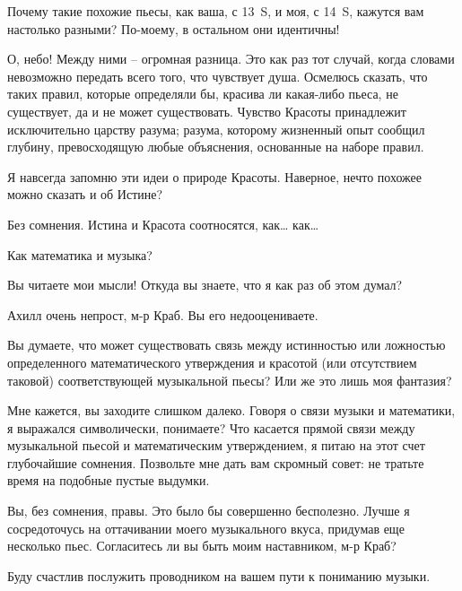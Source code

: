 \documentclass[../main.tex]{subfiles}
\begin{document}
\begin{dialogue}
 Почему такие похожие пьесы, как ваша, с 13~S, и моя, с 14~S, кажутся вам настолько разными? По-моему, в остальном они идентичны!

 О, небо! Между ними \--- огромная разница. Это как раз тот случай, когда словами невозможно передать всего того, что чувствует душа. Осмелюсь сказать, что таких правил, которые определяли бы, красива ли какая-либо пьеса, не существует, да и не может существовать. Чувство Красоты принадлежит исключительно царству разума; разума, которому жизненный опыт сообщил глубину, превосходящую любые объяснения, основанные на наборе правил.

 Я навсегда запомню эти идеи о природе Красоты. Наверное, нечто похожее можно сказать и об Истине?

 Без сомнения. Истина и Красота соотносятся, как\ldots{} как\ldots{}

 Как математика и музыка?

 Вы читаете мои мысли! Откуда вы знаете, что я как раз об этом думал?

 Ахилл очень непрост, м-р Краб. Вы его недооцениваете.

 Вы думаете, что может существовать связь между истинностью или ложностью определенного математического утверждения и красотой (или отсутствием таковой) соответствующей музыкальной пьесы? Или же это лишь моя фантазия?

 Мне кажется, вы заходите слишком далеко. Говоря о связи музыки и математики, я выражался символически, понимаете? Что касается прямой связи между музыкальной пьесой и математическим утверждением, я питаю на этот счет глубочайшие сомнения. Позвольте мне дать вам скромный совет: не тратьте время на подобные пустые выдумки.

 Вы, без сомнения, правы. Это было бы совершенно бесполезно. Лучше я сосредоточусь на оттачивании моего музыкального вкуса, придумав еще несколько пьес. Согласитесь ли вы быть моим наставником, м-р Краб?

 Буду счастлив послужить проводником на вашем пути к пониманию музыки.



\end{dialogue}
\end{document}
